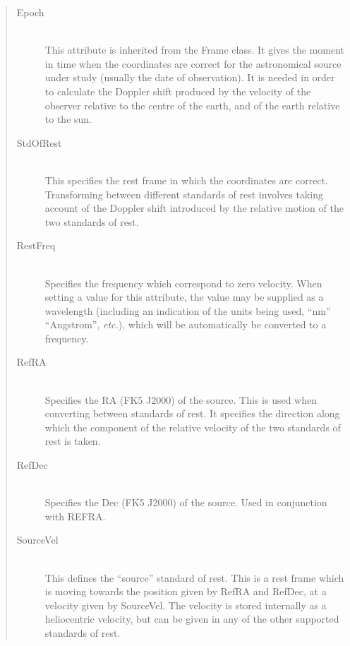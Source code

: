 \documentclass[twoside,11pt]{starlink}
\begin{document}
\begin{quote}
\begin{description}

\item[Epoch]\mbox{}\\
This attribute is inherited from the Frame class. It gives the moment in
time when the coordinates are correct for the astronomical source
under study (usually the date of observation). It is needed in order to
calculate the Doppler shift produced by the velocity of the observer
relative to the centre of the earth, and of the earth relative to the sun.

\item[StdOfRest]\mbox{}\\
This specifies the rest frame in which the coordinates are correct.
Transforming between different standards of rest involves taking account
of the Doppler shift introduced by the relative motion of the two
standards of rest.

\item[RestFreq]\mbox{}\\
Specifies the frequency which correspond to zero velocity. When setting a
value for this attribute, the value may be supplied as a wavelength
(including an indication of the units being used, ``nm'' ``Angstrom'',
\emph{etc.}), which will be automatically be converted to a frequency.

\item[RefRA]\mbox{}\\
Specifies the RA (FK5 J2000) of the source. This is used when converting
between standards of rest. It specifies the direction along which the
component of the relative velocity of the two standards of rest is taken.

\item[RefDec]\mbox{}\\
Specifies the Dec (FK5 J2000) of the source. Used in conjunction with
REFRA.

\item[SourceVel]\mbox{}\\
This defines the ``source'' standard of rest. This is a rest frame which
is moving towards the position given by RefRA and RefDec, at a velocity
given by SourceVel. The velocity is stored internally as a heliocentric
velocity, but can be given in any of the other supported standards of rest.

\end{description}
\end{quote}
\end{document}
